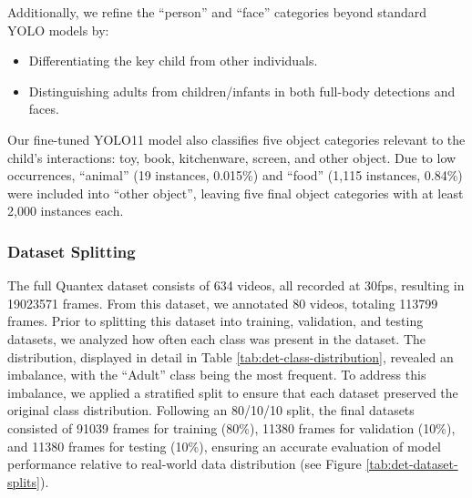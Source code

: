 \documentclass[
  man,floatsintext]{apa6}
\providecommand{\tightlist}{%
  \setlength{\itemsep}{0pt}\setlength{\parskip}{0pt}}
\begin{document}
Additionally, we refine the ``person'' and ``face'' categories beyond standard YOLO models by:

\begin{itemize}
\tightlist
\item
  Differentiating the key child from other individuals.
\item
  Distinguishing adults from children/infants in both full-body detections and faces.
\end{itemize}

Our fine-tuned YOLO11 model also classifies five object categories relevant to the child's interactions: toy, book, kitchenware, screen, and other object. Due to low occurrences, ``animal'' (19 instances, 0.015\%) and ``food'' (1,115 instances, 0.84\%) were included into ``other object'', leaving five final object categories with at least 2,000 instances each.

\subsubsection{Dataset Splitting}\label{dataset-splitting}

The full Quantex dataset consists of 634 videos, all recorded at 30fps, resulting in 19023571 frames. From this dataset, we annotated 80 videos, totaling 113799 frames. Prior to splitting this dataset into training, validation, and testing datasets, we analyzed how often each class was present in the dataset. The distribution, displayed in detail in Table \ref{tab:det-class-distribution}, revealed an imbalance, with the ``Adult'' class being the most frequent. To address this imbalance, we applied a stratified split to ensure that each dataset preserved the original class distribution. Following an 80/10/10 split, the final datasets consisted of 91039 frames for training (80\%), 11380 frames for validation (10\%), and 11380 frames for testing (10\%), ensuring an accurate evaluation of model performance relative to real-world data distribution (see Figure \ref{tab:det-dataset-splits}).
\end{document}
